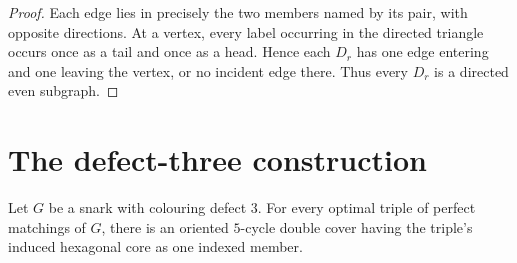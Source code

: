 \documentclass[justified,notoc,twoside,nobib,nofonts]{tufte-handout}
\begin{document}
\begin{proof}
Each edge lies in precisely the two members named by its pair, with opposite
directions.  At a vertex, every label occurring in the directed triangle
occurs once as a tail and once as a head.  Hence each \(D_r\) has one edge
entering and one leaving the vertex, or no incident edge there.  Thus every
\(D_r\) is a directed even subgraph.
\end{proof}

\section{The defect-three construction}

\begin{theorem}\label{thm:main}
Let \(G\) be a snark with colouring defect \(3\).  For every optimal triple
of perfect matchings of \(G\), there is an oriented \(5\)-cycle double cover
having the triple's induced hexagonal core as one indexed member.
\end{theorem}
\end{document}
